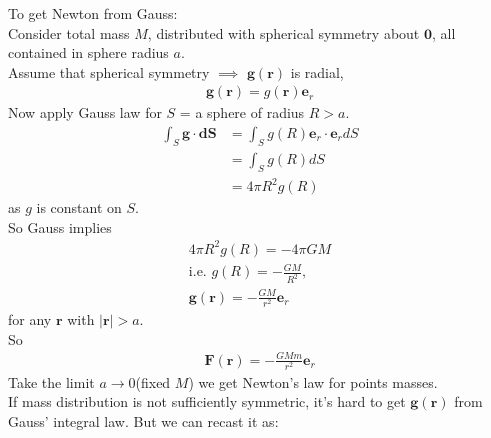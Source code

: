 \documentclass[a4paper]{article}
\begin{document}
To get Newton from Gauss:\\
Consider total mass $M$, distributed with spherical symmetry about $\mathbf{0}$, all contained in sphere radius $a$.\\
Assume that spherical symmetry $\implies$ $\mathbf{g}\left(\mathbf{r}\right)$ is radial,
\begin{equation*}
\begin{aligned}
\mathbf{g}\left(\mathbf{r}\right) = g\left(\mathbf{r}\right)\mathbf{e}_r
\end{aligned}
\end{equation*}
Now apply Gauss law for $S$ = a sphere of radius $R>a$.
\begin{equation*}
\begin{aligned}
\int_S \mathbf{g}\cdot \mathbf{dS} &= \int_S g\left(R\right)\mathbf{e}_r\cdot\mathbf{e}_r dS\\
&=\int_S g\left(R\right)dS\\
&=4\pi R^2 g\left(R\right)
\end{aligned}
\end{equation*}
as $g$ is constant on $S$.\\
So Gauss implies
\begin{equation*}
\begin{aligned}
4\pi R^2 g\left(R\right) = -4\pi GM\\
\text{i.e.  } g\left(R\right) = -\frac{GM}{R^2},\\
\mathbf{g}\left(\mathbf{r}\right) = -\frac{GM}{r^2}\mathbf{e}_r
\end{aligned}
\end{equation*}
for any $\mathbf{r}$ with $|\mathbf{r}| > a$.\\
So
\begin{equation*}
\begin{aligned}
\mathbf{F}\left(\mathbf{r}\right) = -\frac{GMm}{r^2}\mathbf{e}_r
\end{aligned}
\end{equation*}
Take the limit $a\to 0$(fixed $M$) we get Newton's law for points masses.\\

If mass distribution is not sufficiently symmetric, it's hard to get $\mathbf{g}\left(\mathbf{r}\right)$ from Gauss' integral law. But we can recast it as:
\end{document}
